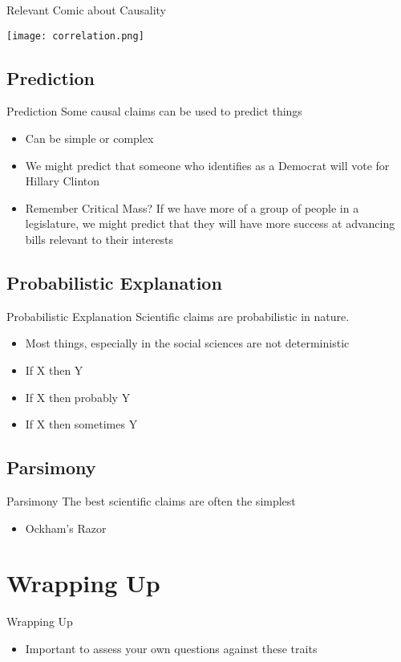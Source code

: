 \documentclass{beamer}
\begin{document}
\begin{frame}{Relevant Comic about Causality}
\begin{center}
\texttt{[image: correlation.png]}
\end{center}
\end{frame}
\subsection{Prediction}
\begin{frame}{Prediction}
Some causal claims can be used to predict things
\begin{itemize}
\item Can be simple or complex
\item We might predict that someone who identifies as a Democrat will vote for Hillary Clinton
\item Remember Critical Mass? If we have more of a group of people in a legislature, we might predict that they will have more success at advancing bills relevant to their interests
\end{itemize}
\end{frame}
\subsection{Probabilistic Explanation}
\begin{frame}{Probabilistic Explanation}
Scientific claims are probabilistic in nature.
\begin{itemize}
\item Most things, especially in the social sciences are not deterministic
\item If X then Y
\item If X then probably Y
\item If X then sometimes Y
\end{itemize}
\end{frame}
\subsection{Parsimony}
\begin{frame}{Parsimony}
The best scientific claims are often the simplest
\begin{itemize}
\item Ockham's Razor
\end{itemize}
\end{frame}
\section{Wrapping Up}
\begin{frame}{Wrapping Up}
\begin{itemize}
\item Important to assess your own questions against these traits
\end{itemize}
\end{frame}
\end{document}
